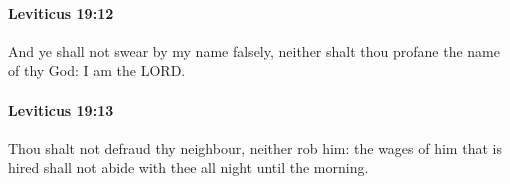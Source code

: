 		\paragraph{Leviticus 19:12} %
			\label{LEVITICUS-19-12}

			And ye shall not swear by my name falsely, neither shalt thou profane the name of thy God: I am the LORD.


		\paragraph{Leviticus 19:13} %
			\label{LEVITICUS-19-13}

			Thou shalt not defraud thy neighbour, neither rob him: the wages of him that is hired shall not abide with thee all night until the morning.


